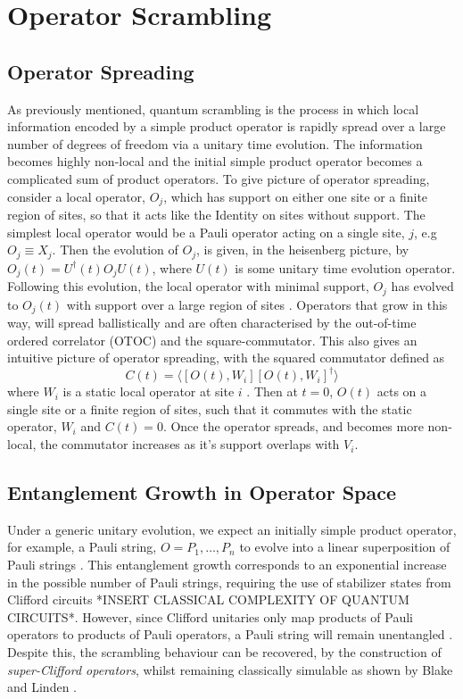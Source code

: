 \section{Operator Scrambling}
\subsection{Operator Spreading}

As previously mentioned, quantum scrambling is the process in which local information
encoded by a simple product operator is rapidly spread over a large number of degrees of freedom via a unitary time evolution.
The information becomes highly non-local and the initial simple product operator becomes a complicated sum of product
operators. To give picture of operator spreading, consider a local operator,
$O_j$, which has support on either one site or a finite region of sites, so that it acts like the Identity on
sites without support. The simplest local operator would be a Pauli operator acting on a single site, $j$, e.g
$O_j \equiv X_j$. Then the evolution of
$O_j$, is given, in the heisenberg picture, by $O_j(t) = U^{\dagger}(t)O_jU(t)$, where $U(t)$ is some unitary time evolution
operator. Following this evolution, the local operator with minimal support, $O_j$ has evolved to $O_j(t)$ with support over a
large region of sites \cite{Khemani_2018}. Operators that grow in this way, will spread ballistically \cite{Roberts_2015, Lieb:1972wy, Schuster_2022} and are often
characterised by the out-of-time ordered correlator (OTOC) \cite{Xu2022} and the square-commutator\cite{Blake_2018}. This also gives an
intuitive picture of operator spreading, with the squared commutator defined as
\begin{equation}
  C(t) = \langle [O(t), W_i][O(t), W_i]^{\dagger}\rangle
\end{equation}
where $W_i$ is a static local operator at site $i$ \cite{https://doi.org/10.48550/arxiv.1804.08655}. Then at $t=0$, $O(t)$
acts on a single site or a finite region of sites, such that it commutes with the static operator, $W_i$ and $C(t) = 0$.
Once the operator spreads, and becomes more non-local, the commutator increases as it's support overlaps with $V_i$.

\subsection{Entanglement Growth in Operator Space}
Under a generic unitary evolution, we expect an initially simple product operator, for example, a Pauli string, $O = P_1, \dots, P_n$
to evolve into a linear superposition of Pauli strings \cite{Roberts_2018, Nahum_2017}. This entanglement growth corresponds to
an exponential increase in the possible number of Pauli strings, requiring the use of stabilizer states from Clifford circuits *INSERT
CLASSICAL COMPLEXITY OF QUANTUM CIRCUITS*.
However, since Clifford unitaries only map products of Pauli operators to products of Pauli operators, a Pauli string
will remain unentangled \cite{Nahum_2018}. Despite this, the scrambling behaviour can be recovered, by the construction
of \textit{super-Clifford operators}, whilst remaining classically simulable as shown by Blake and Linden \cite{Blake2020}.

